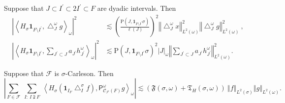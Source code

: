 \documentclass[10pt,a4paper]{amsart}
\begin{document}
\begin{lemma}
\label{Energy Lemma}Suppose that $J\subset
I^{\prime}\subset2I^{\prime}\subset F$ are dyadic intervals. Then
\begin{align*}
\left\vert \left\langle H_{\sigma}\mathbf{1}_{F\setminus I^{\prime}%
},\bigtriangleup_{J}^{\omega}g\right\rangle _{\omega}\right\vert ^{2}  &
\lesssim\left(  \frac{\mathrm{P}\left(  J,\mathbf{1}_{F\setminus I^{\prime}%
}\sigma\right)  }{\ell\left(  J\right)  }\right)  ^{2}\left\Vert
\bigtriangleup_{J}^{\omega}x\right\Vert _{L^{2}\left(  \omega\right)  }%
^{2}\left\Vert \bigtriangleup_{J}^{\omega}g\right\Vert _{L^{2}\left(
\omega\right)  }^{2}\ ,\\
\left\vert \left\langle H_{\sigma}\mathbf{1}_{F\setminus I^{\prime}}%
,\sum_{J^{\prime}\subset J}a_{J^{\prime}}h_{J^{\prime}}^{\omega}\right\rangle
_{\omega}\right\vert ^{2}  & \lesssim\mathrm{P}\left(  J,\mathbf{1}%
_{F\setminus I^{\prime}}\sigma\right)  ^{2}\left\vert J\right\vert _{\omega
}\left\Vert \sum_{J^{\prime}\subset J}a_{J^{\prime}}h_{J^{\prime}}^{\omega
}\right\Vert _{L^{2}\left(  \omega\right)  }^{2}.
\end{align*}

\end{lemma}

\begin{proposition}
\label{strongly adapted'}Suppose that
$\mathcal{F}$ is $\sigma$-Carleson. Then%
\[
\left\vert \sum_{F\in\mathcal{F}}\ \sum_{I:\ I\supsetneqq F}\ \left\langle
H_{\sigma}\left(  \mathbf{1}_{I_{F}}\bigtriangleup_{I}^{\sigma}f\right)
,\mathsf{P}_{\mathcal{C}_{\mathcal{F}}\left(  F\right)  }^{\omega
}g\right\rangle _{\omega}\right\vert \lesssim\left(  \mathfrak{F}\left(
\sigma,\omega\right)  +\mathfrak{T}_{H}\left(  \sigma,\omega\right)  \right)
\ \left\Vert f\right\Vert _{L^{2}\left(  \sigma\right)  }\left\Vert
g\right\Vert _{L^{2}\left(  \omega\right)  }.
\]

\end{proposition}
\end{document}
